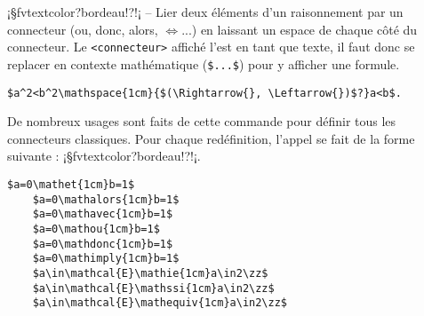 \documentclass[11pt,a4paper,rgb]{report}
\begin{document}
\setlength{\leftskip}{0pt}
\setlength{\textwidth}{18cm}%


\vspace*{.75cm}

\inCodeStub¡§fvtextcolor?bordeau!?!¡ -- Lier deux éléments d'un raisonnement par un connecteur (ou, donc, alors, $\Leftrightarrow$...) en laissant un espace de chaque côté du connecteur. Le \texttt{<connecteur>} affiché l'est en tant que texte, il faut donc se replacer en contexte mathématique (\texttt{\$...\$}) pour y afficher une formule.

\setlength{\leftskip}{.75cm}%
\setlength{\textwidth}{17.25cm}%

\colorbox{blue!15}{}
\hfill
\begin{minipage}{.60\textwidth}
	\begin{lstlisting}[linewidth=\textwidth, language={[LaTeX]TeX}]
	$a^2<b^2\mathspace{1cm}{$(\Rightarrow{}, \Leftarrow{})$?}a<b$.
	\end{lstlisting}
\end{minipage}

De nombreux usages sont faits de cette commande pour définir tous les connecteurs classiques. Pour chaque redéfinition, l'appel se fait de la forme suivante : \inCodeStub¡§fvtextcolor?bordeau!?!¡.

\colorbox{blue!15}{}
\hfill
\begin{minipage}{.60\textwidth}
	\begin{lstlisting}[linewidth=\textwidth, language={[LaTeX]TeX}]
	$a=0\mathet{1cm}b=1$
	$a=0\mathalors{1cm}b=1$
	$a=0\mathavec{1cm}b=1$
	$a=0\mathou{1cm}b=1$
	$a=0\mathdonc{1cm}b=1$
	$a=0\mathimply{1cm}b=1$
	$a\in\mathcal{E}\mathie{1cm}a\in2\zz$
	$a\in\mathcal{E}\mathssi{1cm}a\in2\zz$
	$a\in\mathcal{E}\mathequiv{1cm}a\in2\zz$
	\end{lstlisting}
\end{minipage}
\end{document}
